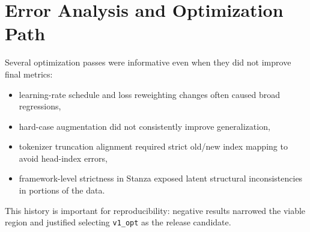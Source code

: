 \section{Error Analysis and Optimization Path}



Several optimization passes were informative even when they did not improve final metrics:

\begin{itemize}[leftmargin=1.25em]

  \item learning-rate schedule and loss reweighting changes often caused broad regressions,

  \item hard-case augmentation did not consistently improve generalization,

  \item tokenizer truncation alignment required strict old/new index mapping to avoid head-index errors,

  \item framework-level strictness in Stanza exposed latent structural inconsistencies in portions of the data.

\end{itemize}



This history is important for reproducibility: negative results narrowed the viable region and justified selecting \texttt{v1\_opt} as the release candidate.


